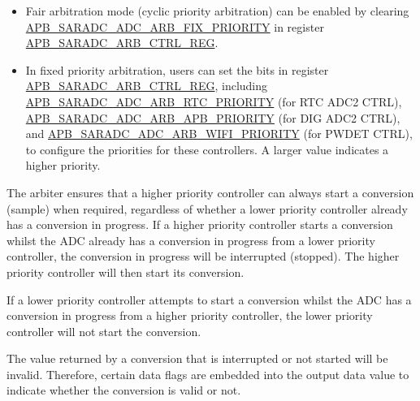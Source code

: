 \documentclass[main\_\_EN.tex]{subfiles}
\begin{document}
\begin{itemize}
    \item Fair arbitration mode (cyclic priority arbitration) can be enabled by clearing \hyperref[fielddesc:APBSARADCADCARBFIXPRIORITY]{APB\_SARADC\_ADC\_ARB\_FIX\_PRIORITY} in register \hyperref[regdesc:APBSARADCARBCTRLREG]{APB\_SARADC\_ARB\_CTRL\_REG}.
    \item In fixed priority arbitration, users can set the bits in register \hyperref[regdesc:APBSARADCARBCTRLREG]{APB\_SARADC\_ARB\_CTRL\_REG}, including \hyperref[fielddesc:APBSARADCADCARBRTCPRIORITY]{APB\_SARADC\_ADC\_ARB\_RTC\_PRIORITY} (for RTC ADC2 CTRL), \hyperref[fielddesc:APBSARADCADCARBAPBPRIORITY]{APB\_SARADC\_ADC\_ARB\_APB\_PRIORITY} (for DIG ADC2 CTRL), and \hyperref[fielddesc:APBSARADCADCARBWIFIPRIORITY]{APB\_SARADC\_ADC\_ARB\_WIFI\_PRIORITY} (for PWDET CTRL), to configure the priorities for these controllers. A larger value indicates a higher priority.
\end{itemize}

The arbiter ensures that a higher priority controller can always start a conversion (sample) when required, regardless of whether a lower priority controller already has a conversion in progress. If a higher priority controller starts a conversion whilst the ADC already has a conversion in progress from a lower priority controller, the conversion in progress will be interrupted (stopped). The higher priority controller will then start its conversion.

If a lower priority controller attempts to start a conversion whilst the ADC has a conversion in progress from a higher priority controller, the lower priority controller will not start the conversion.

The value returned by a conversion that is interrupted or not started will be invalid. Therefore, certain data flags are embedded into the output data value to indicate whether the conversion is valid or not.
\end{document}
